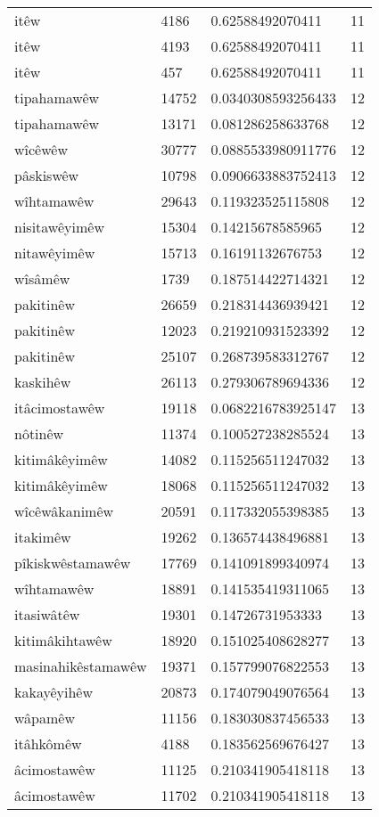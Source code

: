 \begin{longtable}{llll}
itêw & 4186 & 0.62588492070411 & 11\\
itêw & 4193 & 0.62588492070411 & 11\\
itêw & 457 & 0.62588492070411 & 11\\
tipahamawêw & 14752 & 0.0340308593256433 & 12\\
tipahamawêw & 13171 & 0.081286258633768 & 12\\
wîcêwêw & 30777 & 0.0885533980911776 & 12\\
pâskiswêw & 10798 & 0.0906633883752413 & 12\\
wîhtamawêw & 29643 & 0.119323525115808 & 12\\
nisitawêyimêw & 15304 & 0.14215678585965 & 12\\
nitawêyimêw & 15713 & 0.16191132676753 & 12\\
wîsâmêw & 1739 & 0.187514422714321 & 12\\
pakitinêw & 26659 & 0.218314436939421 & 12\\
pakitinêw & 12023 & 0.219210931523392 & 12\\
pakitinêw & 25107 & 0.268739583312767 & 12\\
kaskihêw & 26113 & 0.279306789694336 & 12\\
itâcimostawêw & 19118 & 0.0682216783925147 & 13\\
nôtinêw & 11374 & 0.100527238285524 & 13\\
kitimâkêyimêw & 14082 & 0.115256511247032 & 13\\
kitimâkêyimêw & 18068 & 0.115256511247032 & 13\\
wîcêwâkanimêw & 20591 & 0.117332055398385 & 13\\
itakimêw & 19262 & 0.136574438496881 & 13\\
pîkiskwêstamawêw & 17769 & 0.141091899340974 & 13\\
wîhtamawêw & 18891 & 0.141535419311065 & 13\\
itasiwâtêw & 19301 & 0.14726731953333 & 13\\
kitimâkihtawêw & 18920 & 0.151025408628277 & 13\\
masinahikêstamawêw & 19371 & 0.157799076822553 & 13\\
kakayêyihêw & 20873 & 0.174079049076564 & 13\\
wâpamêw & 11156 & 0.183030837456533 & 13\\
itâhkômêw & 4188 & 0.183562569676427 & 13\\
âcimostawêw & 11125 & 0.210341905418118 & 13\\
âcimostawêw & 11702 & 0.210341905418118 & 13\\

\end{longtable}
